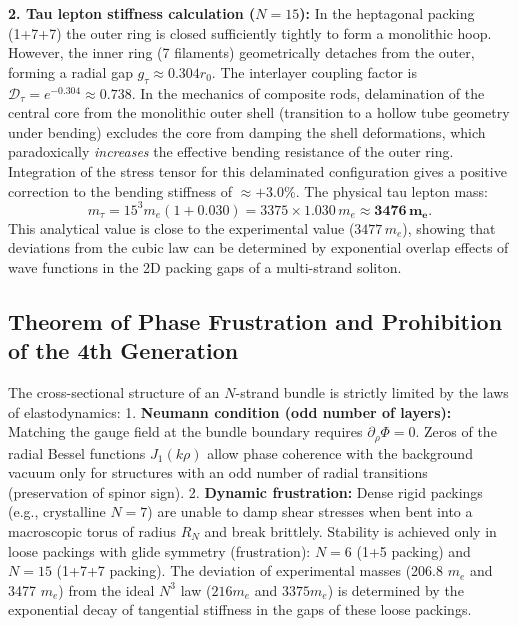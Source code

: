 \documentclass[11pt,a4paper]{article}
\begin{document}
\textbf{2. Tau lepton stiffness calculation ($N=15$):}
In the heptagonal packing (1+7+7) the outer ring is closed sufficiently tightly to form a monolithic hoop. However, the inner ring (7 filaments) geometrically detaches from the outer, forming a radial gap $g_\tau \approx 0.304 r_0$. The interlayer coupling factor is $\mathcal{D}_\tau = e^{-0.304} \approx 0.738$.
In the mechanics of composite rods, delamination of the central core from the monolithic outer shell (transition to a hollow tube geometry under bending) excludes the core from damping the shell deformations, which paradoxically \textit{increases} the effective bending resistance of the outer ring. Integration of the stress tensor for this delaminated configuration gives a positive correction to the bending stiffness of $\approx +3.0\%$. The physical tau lepton mass:
\begin{equation}
m_\tau = 15^3 m_e (1 + 0.030) = 3375 \times 1.030 \, m_e \approx \mathbf{3476 \, m_e}.
\end{equation}
This analytical value is close to the experimental value ($3477 \, m_e$), showing that deviations from the cubic law can be determined by exponential overlap effects of wave functions in the 2D packing gaps of a multi-strand soliton.

\subsection{Theorem of Phase Frustration and Prohibition of the 4th Generation}
The cross-sectional structure of an $N$-strand bundle is strictly limited by the laws of elastodynamics:
1. \textbf{Neumann condition (odd number of layers):} Matching the gauge field at the bundle boundary requires $\partial_\rho \Phi = 0$. Zeros of the radial Bessel functions $J_1(k\rho)$ allow phase coherence with the background vacuum only for structures with an odd number of radial transitions (preservation of spinor sign).
2. \textbf{Dynamic frustration:} Dense rigid packings (e.g., crystalline $N=7$) are unable to damp shear stresses when bent into a macroscopic torus of radius $R_N$ and break brittlely. Stability is achieved only in loose packings with glide symmetry (frustration): $N=6$ (1+5 packing) and $N=15$ (1+7+7 packing).
The deviation of experimental masses (206.8 $m_e$ and 3477 $m_e$) from the ideal $N^3$ law ($216 m_e$ and $3375 m_e$) is determined by the exponential decay of tangential stiffness in the gaps of these loose packings.
\end{document}
